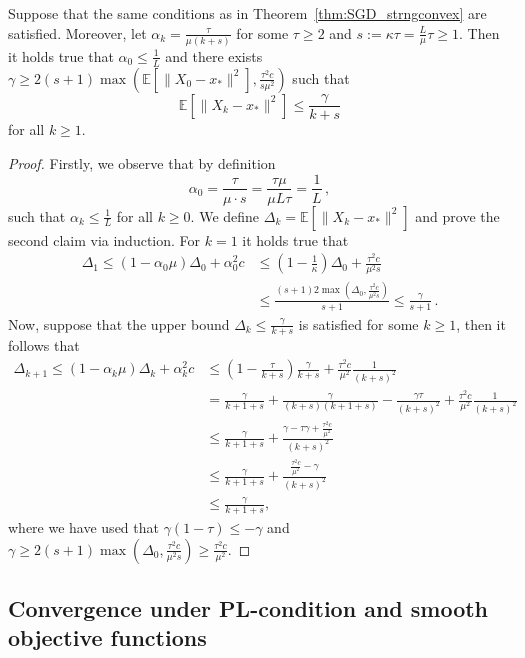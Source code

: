 \documentclass[12pt,openany]{book}
\theoremstyle{definition}
\theoremstyle{definition}
\newcommand{\E}{\mathbb{E}}
\begin{document}
\begin{cor}\label{cor:SGD_strngconvex}
Suppose that the same conditions as in Theorem~\ref{thm:SGD_strngconvex} are satisfied. Moreover, let $\alpha_k = \frac{\tau}{\mu(k+s)}$ for some $\tau\ge 2$ and $s:= \kappa\tau = \frac{L}{\mu}\tau\ge1$. Then it holds true that $\alpha_0\le \frac{1}{L}$ and there exists $\gamma\ge 2(s+1)\max(\E[\|X_0-x_\ast\|^2], \frac{\tau^2c}{s\mu^2})$ such that
\[\E[\|X_k-x_\ast\|^2] \le \frac{\gamma}{k+s}\]
for all $k\ge1$.
\end{cor}
\begin{proof}
Firstly, we observe that by definition
\[ \alpha_0 = \frac{\tau}{\mu \cdot s} = \frac{\tau \mu}{\mu L \tau} = \frac{1}{L}\, , \]
such that $\alpha_k\le\frac1L$ for all $k\ge0$. We define $\Delta_k = \E[\|X_k-x_\ast\|^2]$ and prove the second claim via induction. For $k=1$ it holds true that
\begin{align*}
\Delta_1 \le (1-\alpha_0\mu)\Delta_0 + \alpha_0^2 c &\le (1-\frac{1}{\kappa}) \Delta_0 + \frac{\tau^2 c}{\mu^2 s}\\ &\le \frac{(s+1)2\max(\Delta_0, \frac{\tau^2 c}{\mu^2 s})}{s+1} \le \frac{\gamma}{s+1}\, .
\end{align*}
Now, suppose that the upper bound $\Delta_k\le\frac{\gamma}{k+s}$ is satisfied for some $k\ge1$, then it follows that
\begin{align*}
\Delta_{k+1} \le (1-\alpha_k \mu)\Delta_k + \alpha_k^2 c&\le \left(1-\frac{\tau}{k+s}\right)\frac{\gamma}{k+s} + \frac{\tau^2 c}{\mu^2} \frac{1}{(k+s)^2}\\
&= \frac{\gamma}{k+1+s} + \frac{\gamma}{(k+s)(k+1+s)}-\frac{\gamma\tau}{(k+s)^2} + \frac{\tau^2c}{\mu^2}\frac1{(k+s)^2}\\
&\le \frac\gamma{k+1+s} + \frac{\gamma-\tau\gamma +\frac{\tau^2c}{\mu^2}}{(k+s)^2}\\
&\le \frac\gamma{k+1+s} + \frac{\frac{\tau^2c}{\mu^2}-\gamma}{(k+s)^2}\\
&\le \frac\gamma{k+1+s},
\end{align*}
where we have used that $\gamma(1-\tau) \le -\gamma$ and $\gamma\ge 2(s+1) \max(\Delta_0, \frac{\tau^2c}{\mu^2s})\ge \frac{\tau^2 c}{\mu^2}$.
\end{proof}


\subsection{Convergence under PL-condition and smooth objective functions}
\end{document}
